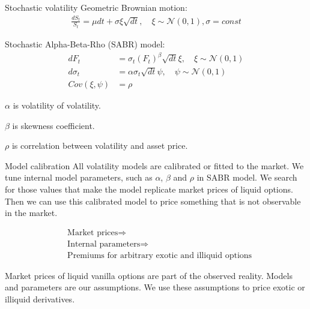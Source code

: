 \documentclass{beamer}
\begin{document}
\begin{frame}{Stochastic volatility}
\justify
Geometric Brownian motion:
\begin{align*}
\frac{dS_t}{S_t} = \mu dt + \sigma\xi\sqrt{dt}, \quad \xi \sim \mathcal{N}(0, 1), \sigma = const
\end{align*}

\justify
Stochastic Alpha-Beta-Rho (SABR) model:
\begin{align*}
dF_t &= \sigma_t(F_t)^\beta \sqrt{dt}\xi, \quad \xi \sim \mathcal{N}(0, 1) \\
d\sigma_t &= \alpha\sigma_t\sqrt{dt}\psi, \quad \psi \sim \mathcal{N}(0, 1) \\
Cov(\xi, \psi) &= \rho
\end{align*}

\justify
$\alpha$ is volatility of volatility.

$\beta$ is skewness coefficient.

$\rho$ is correlation between volatility and asset price.
\end{frame}



\begin{frame}{Model calibration}
\justify
All volatility models are calibrated or fitted to the market. We tune internal model parameters, such as $\alpha$, $\beta$ and $\rho$ in SABR model. We search for those values that make the model replicate market prices of liquid options. Then we can use this calibrated model to price something that is not observable in the market.

\begin{align*}
&\text{Market prices} \Rightarrow \\
&\text{Internal parameters} \Rightarrow \\
&\text{Premiums for arbitrary exotic and illiquid options}
\end{align*}

\justify
Market prices of liquid vanilla options are part of the observed reality. Models and parameters are our assumptions. We use these assumptions to price exotic or illiquid derivatives.
\end{frame}
\end{document}
